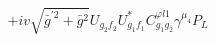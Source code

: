 %
\begin{dmath*}
%
  +  i v \sqrt{{\bar g}^{\prime 2} + {\bar g}{}^2}U_{g_2 f_2} U_{g_1 f_1}^* C^{ \varphi  l1}_{g_1 g_2} \gamma^{\mu_4} P_L
%
\end{dmath*}
%
